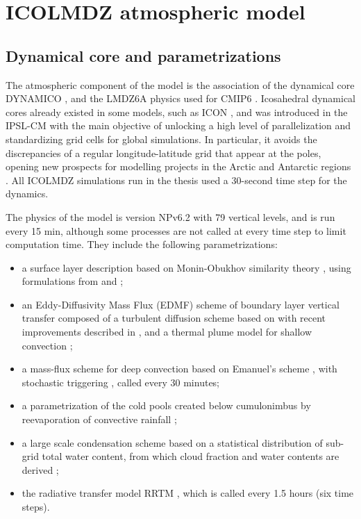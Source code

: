 \section{ICOLMDZ atmospheric model}
\subsection{Dynamical core and parametrizations}
The atmospheric component of the model is the association of the dynamical core DYNAMICO \citep{dubos_dynamico-10_2015}, and the LMDZ6A physics used for CMIP6 \citep{hourdin_lmdz6a_2020}. 
Icosahedral dynamical cores already existed in some models, such as ICON \citep{zangl_icon_2015,giorgetta_icon-_2018,prill_icon_2022}, and was introduced in the IPSL-CM with the main objective of unlocking a high level of parallelization and standardizing grid cells for global simulations. In particular, it avoids the discrepancies of a regular longitude-latitude grid that appear at the poles, opening new prospects for modelling projects in the Arctic \citep{raillard_leveraging_2024} and Antarctic regions \citep{wiener_extensive_2025}.
All ICOLMDZ simulations run in the thesis used a 30-second time step for the dynamics.

The physics of the model is version NPv6.2 with 79 vertical levels, and is run every 15 min, although some processes are not called at every time step to limit computation time.
They include the following parametrizations:
\begin{itemize}
    \item a surface layer description based on Monin-Obukhov similarity theory \citep{monin1954osnovnye}, using formulations from \cite{louis_parametric_1979} and \cite{king_sensitivity_2001}; 
    \item an Eddy-Diffusivity Mass Flux (EDMF) scheme of boundary layer vertical transfer composed of a turbulent diffusion scheme based on \cite{yamada_simulations_1983} with recent improvements described in \cite{vignon_modeling_2018}, and a thermal plume model for shallow convection \citep{rio_thermal_2008, hourdin_unified_2019}; 
    \item a mass-flux scheme for deep convection based on Emanuel's scheme \citep{emanuel_scheme_1991, grandpeix_improved_2004, rio_control_2013}, with stochastic triggering \citep{rochetin_deep_2014, rochetin_deep_2014-1}, called every 30 minutes; 
    \item a parametrization of the cold pools created below cumulonimbus by reevaporation of convective rainfall \citep{grandpeix_density_2010-1,grandpeix_density_2010};
    \item a large scale condensation scheme based on a statistical distribution of sub-grid total water content, from which cloud fraction and water contents are derived \citep{madeleine_improved_2020}; 
    \item the radiative transfer model RRTM \citep{mlawer_radiative_1997}, which is called every 1.5 hours (six time steps).
\end{itemize}


